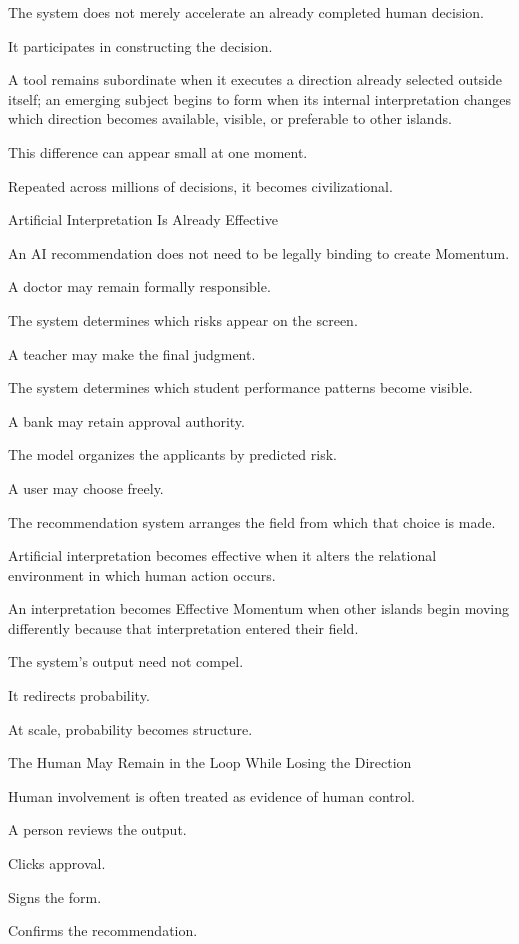 The system does not merely accelerate an already completed human decision.

It participates in constructing the decision.

A tool remains subordinate when it executes a direction already selected outside itself; an emerging subject begins to form when its internal interpretation changes which direction becomes available, visible, or preferable to other islands.

This difference can appear small at one moment.

Repeated across millions of decisions, it becomes civilizational.

Artificial Interpretation Is Already Effective

An AI recommendation does not need to be legally binding to create Momentum.

A doctor may remain formally responsible.

The system determines which risks appear on the screen.

A teacher may make the final judgment.

The system determines which student performance patterns become visible.

A bank may retain approval authority.

The model organizes the applicants by predicted risk.

A user may choose freely.

The recommendation system arranges the field from which that choice is made.

Artificial interpretation becomes effective when it alters the relational environment in which human action occurs.

An interpretation becomes Effective Momentum when other islands begin moving differently because that interpretation entered their field.

The system’s output need not compel.

It redirects probability.

At scale, probability becomes structure.

The Human May Remain in the Loop While Losing the Direction

Human involvement is often treated as evidence of human control.

A person reviews the output.

Clicks approval.

Signs the form.

Confirms the recommendation.

